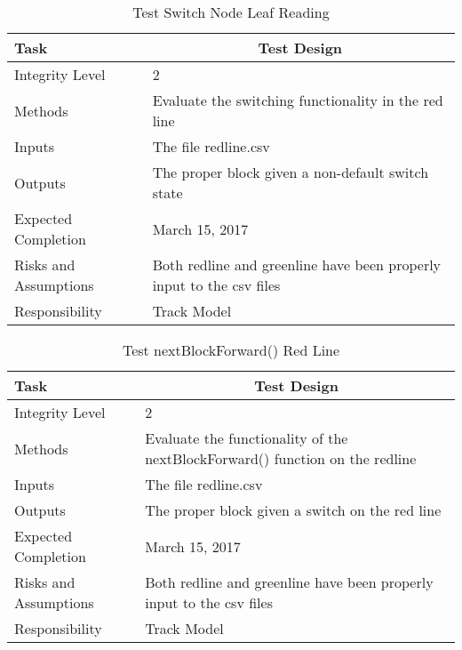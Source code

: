 \documentclass[]{article}
\begin{document}
\begin{table}[H]
	\centering
	\caption{Test Switch Node Leaf Reading}
	\begin{tabular}{|l|l|}
		\hline
		Task & \multicolumn{1}{c|}{Test Design} \\ \hline
		Integrity Level & 2 \\ \hline
		Methods & Evaluate the switching functionality in the red line\\ \hline
		Inputs &  The file redline.csv \\ \hline
		Outputs &  The proper  block given a non-default switch state\\ \hline
		Expected Completion & March 15, 2017\\ \hline
		Risks and Assumptions & Both redline and greenline have been properly input to the csv files \\ \hline
		Responsibility & Track Model\\ \hline
	\end{tabular}
\end{table}

\begin{table}[H]
	\centering
	\caption{Test nextBlockForward() Red Line}
	\begin{tabular}{|l|l|}
		\hline
		Task & \multicolumn{1}{c|}{Test Design} \\ \hline
		Integrity Level & 2 \\ \hline
		Methods & Evaluate the functionality of the nextBlockForward() function on the redline \\ \hline
		Inputs &  The file redline.csv \\ \hline
		Outputs &  The proper block given a switch on the red line\\ \hline
		Expected Completion & March 15, 2017\\ \hline
		Risks and Assumptions & Both redline and greenline have been properly input to the csv files \\ \hline
		Responsibility & Track Model\\ \hline
	\end{tabular}
\end{table}
\end{document}
